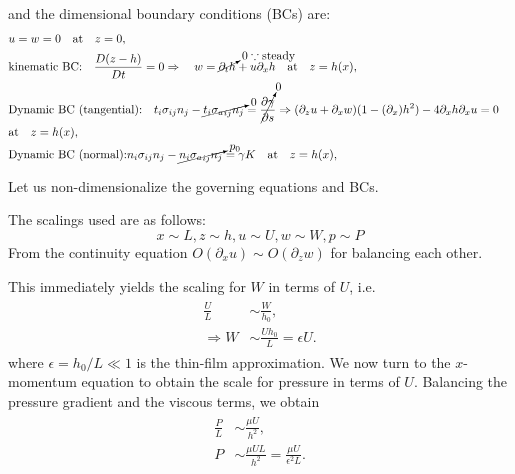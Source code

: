 \documentclass{article}
\begin{document}
and the dimensional boundary conditions (BCs) are:
\begin{align}\label{eq:pendant_bcs_dim}
 \begin{split}
  & u = w = 0 \quad  \textrm{at} \quad z = 0,\\
  &\textrm{kinematic BC:} \quad \frac{D(z-h)}{Dt} = 0 \Rightarrow \quad w =\cancelto{0 \because \textrm{steady}}{\partial_{t} h} + u \partial_{x}h \quad  \textrm{at} \quad z = h(x),\\
  & \textrm{Dynamic BC (tangential):} \quad t_{i}\sigma_{ij}n_{j} - \cancelto{0}{t_{i}{\sigma_{a}}_{ij} n_{j} } = \cancelto{0}{\frac{\partial \gamma}{\partial s}} \Rightarrow (\partial_{z}u + \partial_{x}w)(1-(\partial_{x})h^{2}) - 4 \partial_{x}h\partial_{x}u  = 0 \quad \\
  & \textrm{at} \quad z = h(x),\\
  & \textrm{Dynamic BC (normal):}n_{i}\sigma_{ij}n_{j} - \cancelto{p_{0}}{n_{i}{\sigma_{a}}_{ij} n_{j} } = \gamma K \quad \textrm{at} \quad z = h(x),\\
 \end{split}
\end{align}

Let us non-dimensionalize the governing equations and BCs. 

The scalings used are as follows:
\begin{equation}\label{eq:pendant_scalings}
 x \sim L, z \sim h, u \sim U, w \sim W, p \sim P
\end{equation}
From the continuity equation $O(\partial_{x}u) \sim O(\partial_{z}w)$ for balancing each other. 

This immediately yields the scaling for $W$ in terms of $U$, i.e. 
\begin{align}\label{eq:pendant_w_scale}
 \begin{split}
  \frac{U}{L} &\sim \frac{W}{h_{0}},\\
  \Rightarrow W &\sim \frac{Uh_{0}}{L} = \epsilon U.
 \end{split}
\end{align}
where $\epsilon = h_{0}/L \ll 1 $ is the thin-film approximation. We now turn to the $x$-momentum equation to obtain the scale for pressure in terms of $U$. Balancing the pressure gradient and the viscous terms, we obtain
\begin{align}\label{eq:pendant_p_scale}
 \begin{split}
  \frac{P}{L} &\sim \frac{\mu U}{h^{2}},\\
  P & \sim \frac{\mu U L}{h^{2}} = \frac{\mu U}{\epsilon^{2}L}.
 \end{split}
\end{align}
\end{document}
